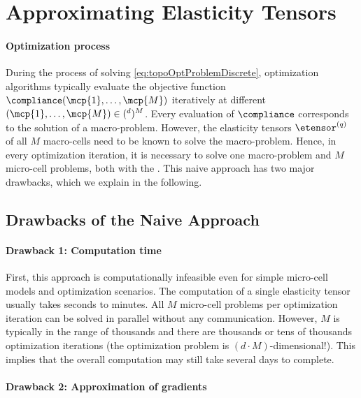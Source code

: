 \breakpagebeforenextheadingtrue
\section{Approximating Elasticity Tensors}
\label{sec:62tensors}

\paragraph{Optimization process}


During the process of solving \eqref{eq:topoOptProblemDiscrete},
optimization algorithms typically
evaluate the objective function $\compliance(\mcp{1}, \dotsc, \mcp{M})$
iteratively at different 
$(\mcp{1}, \dotsc, \mcp{M}) \in (\real^d)^M$.
Every evaluation of $\compliance$ corresponds to the solution of a
macro-problem.
However, the elasticity tensors $\etensor^{(q)}$ of all $M$ macro-cells
need to be known to solve the macro-problem.
Hence, in every optimization iteration, it is necessary to solve
one macro-problem and $M$ micro-cell problems,
both with the \fem.
This naive approach has two major drawbacks, which we explain in
the following.



\subsection{Drawbacks of the Naive Approach}
\label{sec:621drawbacks}

\paragraph{Drawback 1: Computation time}

First, this approach is computationally infeasible
even for simple micro-cell models and optimization scenarios.
The computation of a single elasticity tensor usually takes seconds to
minutes.
All $M$ micro-cell problems per optimization iteration
can be solved in parallel without any communication.
However, $M$ is typically in the range of thousands and
there are thousands or tens of thousands optimization iterations
(the optimization problem is $(d \cdot M)$-dimensional!).
This implies that the overall computation may still take
several days to complete.

\paragraph{Drawback 2: Approximation of gradients}


